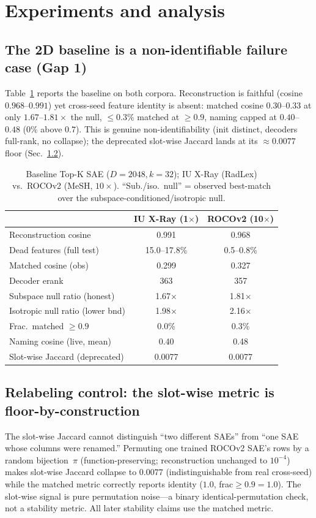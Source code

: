 \documentclass[sigconf, nonacm]{acmart}
\begin{document}
\section{Experiments and analysis}

\subsection{The 2D baseline is a non-identifiable failure case (Gap 1)}
Table~\ref{tab:baseline} reports the baseline on both corpora. Reconstruction is faithful (cosine $0.968$--$0.991$) yet cross-seed feature identity is absent: matched cosine $0.30$--$0.33$ at only $1.67$--$1.81{\times}$ the null, ${\leq}0.3\%$ matched at ${\geq}0.9$, naming capped at $0.40$--$0.48$ ($0\%$ above $0.7$). This is genuine non-identifiability (init distinct, decoders full-rank, no collapse); the deprecated slot-wise Jaccard lands at its ${\approx}0.0077$ floor (Sec.~\ref{sec:relabel}).

\begin{table}[t]
\caption{Baseline Top-K SAE ($D{=}2048,k{=}32$); IU X-Ray (RadLex) vs.\ ROCOv2 (MeSH, $10{\times}$). ``Sub./iso.\ null'' = observed best-match over the subspace-conditioned/isotropic null.}
\label{tab:baseline}
\small
\begin{tabular}{lcc}
\toprule
 & IU X-Ray (1$\times$) & ROCOv2 (10$\times$) \\
\midrule
Reconstruction cosine & 0.991 & 0.968 \\
Dead features (full test) & 15.0--17.8\% & 0.5--0.8\% \\
Matched cosine (obs) & 0.299 & 0.327 \\
Decoder erank & 363 & 357 \\
Subspace null ratio (honest) & 1.67$\times$ & 1.81$\times$ \\
Isotropic null ratio (lower bnd) & 1.98$\times$ & 2.16$\times$ \\
Frac.\ matched $\geq0.9$ & 0.0\% & 0.3\% \\
Naming cosine (live, mean) & 0.40 & 0.48 \\
Slot-wise Jaccard (deprecated) & 0.0077 & 0.0077 \\
\bottomrule
\end{tabular}
\end{table}

\subsection{Relabeling control: the slot-wise metric is floor-by-construction}
\label{sec:relabel}
The slot-wise Jaccard cannot distinguish ``two different SAEs'' from ``one SAE whose columns were renamed.'' Permuting one trained ROCOv2 SAE's rows by a random bijection~$\pi$ (function-preserving; reconstruction unchanged to $10^{-4}$) makes slot-wise Jaccard collapse to $0.0077$ (indistinguishable from real cross-seed) while the matched metric correctly reports identity ($1.0$, frac${\geq}0.9{=}1.0$). The slot-wise signal is pure permutation noise---a binary identical-permutation check, not a stability metric. All later stability claims use the matched metric.
\end{document}
